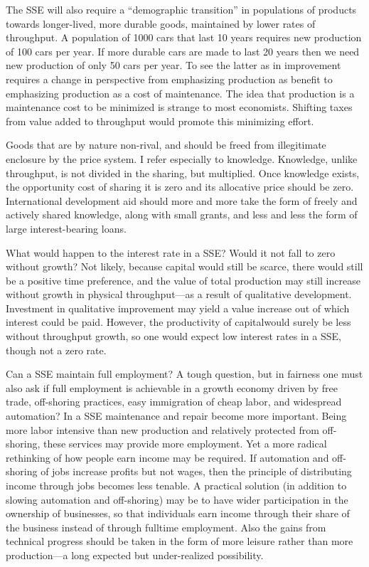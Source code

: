 \documentclass[
]{book}
\begin{document}
The SSE will also require a ``demographic transition'' in populations of products towards longer-lived, more durable
goods, maintained by lower rates of throughput. A population of 1000 cars that last 10 years requires new production
of 100 cars per year. If more durable cars are made to last 20 years then we need new production of only 50 cars per
year. To see the latter as in improvement requires a change in perspective from emphasizing production as benefit to
emphasizing production as a cost of maintenance.
The idea that production is a maintenance cost to be minimized
is strange to most economists.
Shifting taxes from value added to throughput would promote this minimizing effort.

Goods that are by nature non-rival, and should be freed from
illegitimate enclosure by the price system. I refer especially to knowledge. Knowledge, unlike throughput, is not
divided in the sharing, but multiplied.
Once knowledge exists, the opportunity cost of sharing it is zero and its allocative price should be zero. International
development aid should more and more take the form of freely and actively shared knowledge, along with small
grants, and less and less the form of large interest-bearing loans.

What would happen to the interest rate in a SSE? Would it not fall to zero without growth? Not likely, because capital
would still be scarce, there would still be a positive time preference, and the value of total production may still
increase without growth in physical throughput---as a result of qualitative development. Investment in qualitative
improvement may yield a value increase out of which interest could be paid. However, the productivity of capitalwould surely be less without throughput growth, so one would expect low interest rates in a SSE, though not a zero
rate.

Can a SSE maintain full employment? A tough question, but in fairness one must also ask if full employment is
achievable in a growth economy driven by free trade, off-shoring practices, easy immigration of cheap labor, and
widespread automation? In a SSE maintenance and repair become more important. Being more labor intensive than
new production and relatively protected from off-shoring, these services may provide more employment. Yet a more
radical rethinking of how people earn income may be required. If automation and off-shoring of jobs increase
profits but not wages, then the principle of distributing income through jobs becomes less tenable. A practical
solution (in addition to slowing automation and off-shoring) may be to have wider participation in the ownership of
businesses, so that individuals earn income through their share of the business instead of through fulltime
employment. Also the gains from technical progress should be taken in the form of more leisure rather than more
production---a long expected but under-realized possibility.
\end{document}
